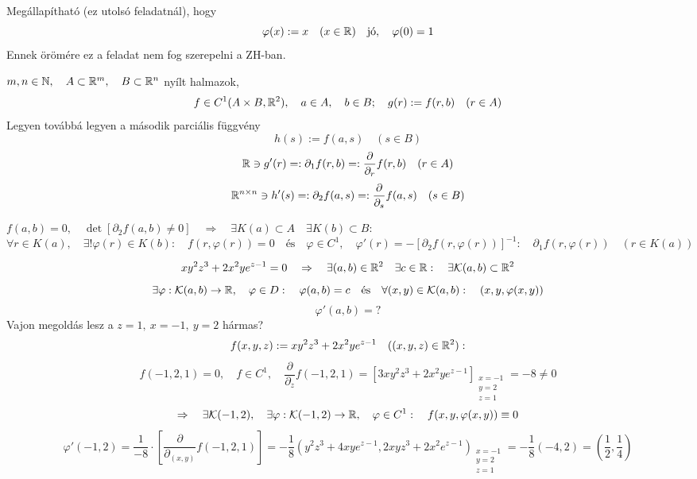 \documentclass[a4paper,11.5pt]{article}
\begin{document}
	\begin{note}
		Megállapítható (ez utolsó feladatnál), hogy
		\[ \varphi(x):=x\quad (x\in\mathbb{R})\quad \text{jó},\quad \varphi(0)=1 \]
		Ennek örömére ez a feladat nem fog szerepelni a ZH-ban.
	\end{note}
	\begin{note}
		$m,n\in\mathbb{N},\quad A\subset \mathbb{R}^m,\quad B\subset \mathbb{R}^n$ nyílt halmazok,
		\[ f\in C^1(A\times B,\mathbb{R}^2),\quad a\in A,\quad b\in B;\quad g(r):=f(r,b)\quad (r\in A) \]
		Legyen továbbá legyen a második parciális függvény 
		\[ h(s):=f(a,s)\quad (s\in B) \]
		\[ \mathbb{R}\ni g'(r)=:\partial_1f(r,b)=:\frac{\partial}{\partial_r}f(r,b)\quad (r\in A) \]
		\[ \mathbb{R}^{n\times n}\ni h'(s)=:\partial_2f(a,s)=:\frac{\partial}{\partial_s}f(a,s)\quad (s\in B) \]
	\end{note}
	\begin{theorem}
		$f(a,b)=0,\quad \det[\partial_2f(a,b)\not=0]\quad \Rightarrow\quad \exists K(a)\subset A\quad \exists K(b)\subset B:$
		\[ \forall r\in K(a),\quad \exists!\varphi(r)\in K(b):\quad f(r,\varphi(r))=0\quad \text{és}\quad \varphi\in C^1,\quad \varphi'(r)=-[\partial_2f(r,\varphi(r))]^{-1}:\quad \partial_1f(r,\varphi(r))\quad (r\in K(a)) \]
	\end{theorem}
	\begin{task}
		\[ xy^2z^3+2x^2ye^{z-1}=0\quad \Rightarrow\quad \exists(a,b)\in\mathbb{R}^2\quad \exists c\in\mathbb{R}:\quad \exists \mathcal{K}(a,b)\subset\mathbb{R}^2 \]
		\[ \exists\varphi:\mathcal{K}(a,b)\to\mathbb{R},\quad \varphi\in D:\quad \varphi(a,b)=c\quad \text{és}\quad \forall(x,y)\in\mathcal{K}(a,b):\quad (x,y,\varphi(x,y))\]
		\[ \varphi'(a,b)=? \]
		Vajon megoldás lesz a $z=1,\ x=-1,\ y=2$ hármas?
		\[ f(x,y,z):=xy^2z^3+2x^2ye^{z-1}\quad ((x,y,z)\in\mathbb{R}^2): \]
		\[ f(-1,2,1)=0,\quad f\in C^1,\quad \frac{\partial}{\partial_z}f(-1,2,1)=\left[3xy^2z^3+2x^2ye^{z-1}\right]_{\substack{x=-1\\y=2\\z=1}}=-8\not=0 \]
		\[ \Rightarrow\quad \exists\mathcal{K}(-1,2),\quad \exists\varphi:\mathcal{K}(-1,2)\to\mathbb{R},\quad \varphi\in C^1:\quad f(x,y,\varphi(x,y))\equiv0 \]
		\[ \varphi'(-1,2)=\frac{1}{-8}\cdot\left[\frac{\partial}{\partial_{(x,y)}}f(-1,2,1)\right]=-\frac{1}{8}\left(y^2z^3+4xye^{z-1},2xyz^3+2x^2e^{z-1}\right)_{\substack{x=-1\\y=2\\z=1}}=-\frac{1}{8}(-4,2)=\left(\frac{1}{2},\frac{1}{4}\right) \]
	\end{task}
\end{document}
